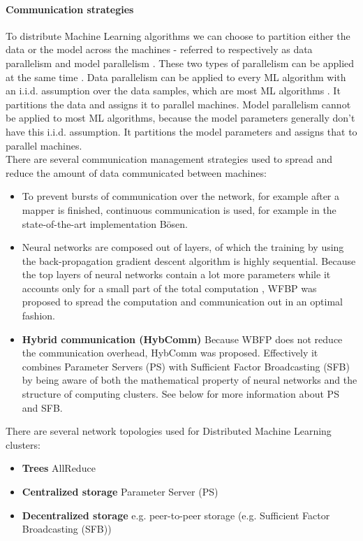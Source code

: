 \paragraph{Communication strategies}
To distribute Machine Learning algorithms we can choose to partition either the data or the model across the machines - referred to respectively as data parallelism and model parallelism \cite{Die12}. These two types of parallelism can be applied at the same time \cite{Xing16}. Data parallelism can be applied to every ML algorithm with an i.i.d. assumption over the data samples, which are most ML algorithms \cite{Xing16}. It partitions the data and assigns it to parallel machines. Model parallelism cannot be applied to most ML algorithms, because the model parameters generally don't have this i.i.d. assumption. It partitions the model parameters and assigns that to parallel machines.\\
There are several communication management strategies\cite{Xing16} used to spread and reduce the amount of data communicated between machines:
\begin{itemize}
	\item To prevent bursts of communication over the network, for example after a mapper is finished, continuous communication is used, for example in the state-of-the-art implementation Bösen\cite{Wei15}.
	
	\item Neural networks are composed out of layers, of which the training by using the back-propagation gradient descent algorithm is highly sequential. Because the top layers of neural networks contain a lot more parameters while it accounts only for a small part of the total computation \cite{Xing16}, WFBP \cite{Zhang17} was proposed to spread the computation and communication out in an optimal fashion.
	
	\item \textbf{Hybrid communication (HybComm)} Because WBFP does not reduce the communication overhead, HybComm \cite{Zhang17} was proposed. Effectively it combines Parameter Servers (PS)\cite{Wei15} with Sufficient Factor Broadcasting (SFB)\cite{Xie15} by being aware of both the mathematical property of neural networks and the structure of computing clusters. See below for more information about PS and SFB.
	
\end{itemize}

There are several network topologies used for Distributed Machine Learning clusters:
\begin{itemize}
	\item \textbf{Trees} AllReduce\cite{Agar14}
	\item \textbf{Centralized storage} Parameter Server (PS)\cite{Agar14}
	\item \textbf{Decentralized storage} e.g. peer-to-peer storage (e.g. Sufficient Factor Broadcasting (SFB)\cite{Li13})
\end{itemize}










